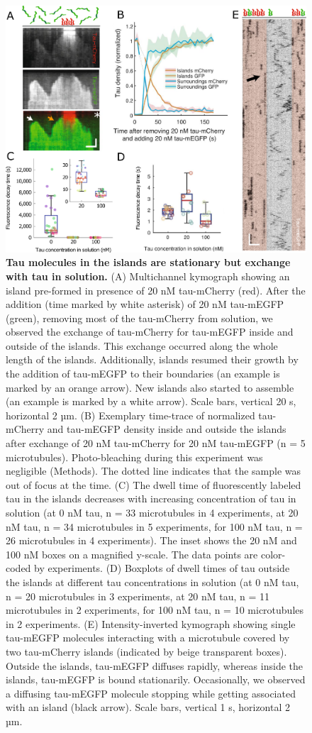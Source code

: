 \begin{figure}[h!]
\centering
\includegraphics[scale=0.8]{Figures/tau2.png}
\caption[Tau molecules in the islands are stationary but exchange with tau in solution.]{
\textbf{Tau molecules in the islands are stationary but exchange with tau in solution.} (A) Multichannel kymograph showing an island pre-formed in presence of 20 nM tau-mCherry (red). After the addition (time marked by white asterisk) of 20 nM tau-mEGFP (green), removing most of the tau-mCherry from solution, we observed the exchange of tau-mCherry for tau-mEGFP inside and outside of the islands. This exchange occurred along the whole length of the islands. Additionally, islands resumed their growth by the addition of tau-mEGFP to their boundaries (an example is marked by an orange arrow). New islands also started to assemble (an example is marked by a white arrow). Scale bars, vertical 20 s, horizontal 2 µm. (B) Exemplary time-trace of normalized tau-mCherry and tau-mEGFP density inside and outside the islands after exchange of 20 nM tau-mCherry for 20 nM tau-mEGFP (n = 5 microtubules). Photo-bleaching during this experiment was negligible (Methods). The dotted line indicates that the sample was out of focus at the time. (C) The dwell time of fluorescently labeled tau in the islands decreases with increasing concentration of tau in solution (at 0 nM tau, n = 33 microtubules in 4 experiments, at 20 nM tau, n = 34 microtubules in 5 experiments, for 100 nM tau, n = 26 microtubules in 4 experiments). The inset shows the 20 nM and 100 nM boxes on a magnified y-scale. The data points are color-coded by experiments. (D) Boxplots of dwell times of tau outside the islands at different tau concentrations in solution (at 0 nM tau, n = 20 microtubules in 3 experiments, at 20 nM tau, n = 11 microtubules in 2 experiments, for 100 nM tau, n = 10 microtubules in 2 experiments. (E) Intensity-inverted kymograph showing single tau-mEGFP molecules interacting with a microtubule covered by two tau-mCherry islands (indicated by beige transparent boxes). Outside the islands, tau-mEGFP diffuses rapidly, whereas inside the islands, tau-mEGFP is bound stationarily. Occasionally, we observed a diffusing tau-mEGFP molecule stopping while getting associated with an island (black arrow). Scale bars, vertical 1 s, horizontal 2 µm.
}
\end{figure}
